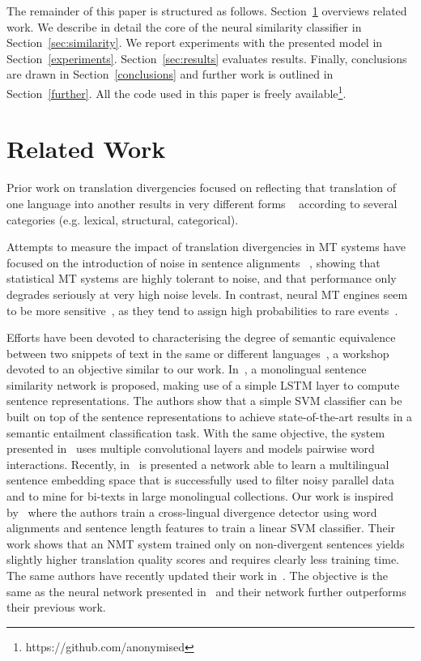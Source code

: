 \documentclass[11pt,a4paper]{article}
\begin{document}
The remainder of this paper is structured as follows. 
Section~\ref{related} overviews related work. 
We describe in detail the core of the neural similarity classifier in Section~\ref{sec:similarity}. 
We report experiments with the presented model in Section~\ref{experiments}.
Section~\ref{sec:results} evaluates results. 
Finally, conclusions are drawn in Section~\ref{conclusions} and further work is outlined in Section~\ref{further}.
All the code used in this paper is freely available\footnote{https://github.com/anonymised}.

\section{Related Work}
\label{related}

Prior work on translation divergencies focused on reflecting that translation of one language into another results in very different forms ~\cite{J94-4004} according to several categories (e.g. lexical, structural, categorical). 

Attempts to measure the impact of translation divergencies in MT systems have focused on the introduction of noise in sentence alignments ~\cite{goute2012}, showing that statistical MT systems are highly tolerant to noise, and that performance only degrades seriously at very high noise levels. 
In contrast, neural MT engines seem to be more sensitive~\cite{chen2016adaptation}, as they tend to assign high probabilities to rare events~\cite{Hassan2018AchievingHP}.

Efforts have been devoted to characterising the degree of semantic equivalence between two snippets of text in the same or different languages~\cite{conf/semeval/AgirreBCDGMRW16}, a workshop devoted to an objective similar to our work. 
In~\cite{Mueller:2016:SRA:3016100.3016291}, a monolingual sentence similarity network is proposed, making use of a simple LSTM layer to compute sentence representations. 
The authors show that a simple SVM classifier can be built on top of the sentence representations to achieve state-of-the-art results in a semantic entailment classification task. 
With the same objective, the system presented in~\cite{N16-1108} uses multiple convolutional layers and models pairwise word interactions. 
Recently, in~\cite{P18-2037} is presented a network able to learn a multilingual sentence embedding space that is successfully used to filter noisy parallel data and to mine for bi-texts in large monolingual collections.
Our work is inspired by~\cite{W17-3209} where the authors train a cross-lingual divergence detector using word alignments and sentence length features to train a linear SVM classifier. 
Their work shows that an NMT system trained only on non-divergent sentences yields slightly higher translation quality scores and requires clearly less training time. 
The same authors have recently updated their work in~\cite{DBLP:journals/corr/abs-1803-11112}. 
The objective is the same as the neural network presented in~\cite{N16-1108} and their network further outperforms their previous work. 
\end{document}
